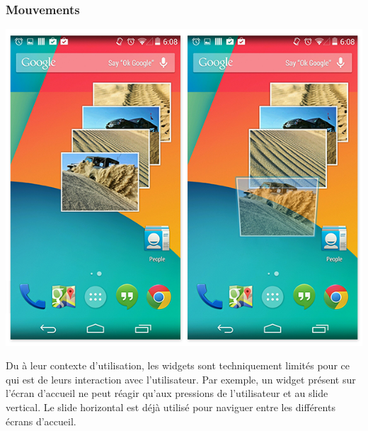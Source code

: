 \documentclass{beamer}
\begin{document}
\begin{frame}
\frametitle{Mouvements}
\begin{center}
\includegraphics[scale=0.2]{widgets_gestures.png}
\end{center}
Du à leur contexte d'utilisation, les widgets sont techniquement 
limités pour ce qui est de leurs interaction avec l'utilisateur.
Par exemple, un widget présent sur l'écran d’accueil ne peut réagir 
qu'aux pressions de l'utilisateur et au slide vertical.
Le slide horizontal est déjà utilisé pour naviguer entre les
différents écrans d’accueil.
\end{frame}
\end{document}
